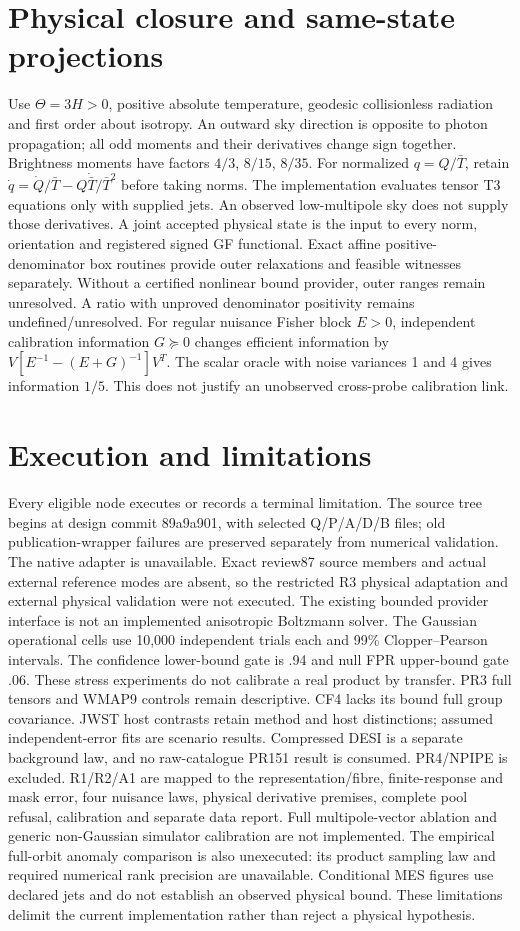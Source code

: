 \documentclass[11pt]{article}
\begin{document}
\section{Physical closure and same-state projections}
Use $\Theta=3H>0$, positive absolute temperature, geodesic collisionless radiation and first order about isotropy. An outward sky direction is opposite to photon propagation; all odd moments and their derivatives change sign together. Brightness moments have factors $4/3$, $8/15$, $8/35$. For normalized $q=Q/\bar T$, retain $\dot q=\dot Q/\bar T-Q\dot{\bar T}/\bar T^2$ before taking norms. The implementation evaluates tensor T3 equations only with supplied jets. An observed low-multipole sky does not supply those derivatives.
A joint accepted physical state is the input to every norm, orientation and registered signed GF functional. Exact affine positive-denominator box routines provide outer relaxations and feasible witnesses separately. Without a certified nonlinear bound provider, outer ranges remain unresolved. A ratio with unproved denominator positivity remains undefined/unresolved.
For regular nuisance Fisher block $E>0$, independent calibration information $G\succeq0$ changes efficient information by $V[E^{-1}-(E+G)^{-1}]V^T$. The scalar oracle with noise variances 1 and 4 gives information $1/5$. This does not justify an unobserved cross-probe calibration link.
\section{Execution and limitations}
Every eligible node executes or records a terminal limitation. The source tree begins at design commit 89a9a901, with selected Q/P/A/D/B files; old publication-wrapper failures are preserved separately from numerical validation. The native adapter is unavailable. Exact review87 source members and actual external reference modes are absent, so the restricted R3 physical adaptation and external physical validation were not executed. The existing bounded provider interface is not an implemented anisotropic Boltzmann solver.
The Gaussian operational cells use 10,000 independent trials each and 99\% Clopper--Pearson intervals. The confidence lower-bound gate is .94 and null FPR upper-bound gate .06. These stress experiments do not calibrate a real product by transfer. PR3 full tensors and WMAP9 controls remain descriptive. CF4 lacks its bound full group covariance. JWST host contrasts retain method and host distinctions; assumed independent-error fits are scenario results. Compressed DESI is a separate background law, and no raw-catalogue PR151 result is consumed. PR4/NPIPE is excluded.
R1/R2/A1 are mapped to the representation/fibre, finite-response and mask error, four nuisance laws, physical derivative premises, complete pool refusal, calibration and separate data report. Full multipole-vector ablation and generic non-Gaussian simulator calibration are not implemented. The empirical full-orbit anomaly comparison is also unexecuted: its product sampling law and required numerical rank precision are unavailable. Conditional MES figures use declared jets and do not establish an observed physical bound. These limitations delimit the current implementation rather than reject a physical hypothesis.
\end{document}
